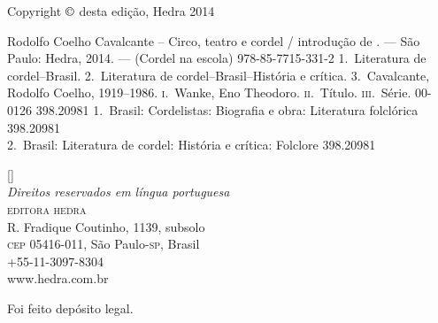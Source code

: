 
\clearpage

\begingroup
\centering
\footnotesize

Copyright $\copyright$ desta edição, Hedra 2014\\\medskip

%
%
%
%
%

%
{Rodolfo Coelho Cavalcante -- Circo, teatro e cordel / introdução de \introdutor. --- São Paulo: Hedra, 2014. --- (Cordel na escola)}
{978-85-7715-331-2}%
{1.~Literatura de cordel--Brasil. 2.~Literatura de
cordel--Brasil--História e crítica. 3.~Cavalcante, Rodolfo Coelho, 1919--1986.
\textsc{i}.~Wanke, Eno Theodoro. \textsc{ii}.~Título.
\textsc{iii}.~Série.}%
{00-0126}%
{398.20981}%
{1.~Brasil: Cordelistas: Biografia e obra: Literatura folclórica 398.20981\\
2.~Brasil: Literatura de cordel: História e crítica: Folclore 398.20981}

\vfill

[\the\year]\\
\textit{Direitos reservados em língua portuguesa}\\
\textsc{editora hedra}\\
R. Fradique Coutinho, 1139, subsolo\\
\textsc{cep} 05416-011,  São Paulo-\textsc{sp}, Brasil\\
+55-11-3097-8304\\ 
www.hedra.com.br\\\smallskip

Foi feito depósito legal.

\par
\endgroup
\clearpage
